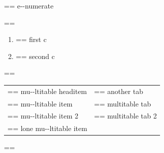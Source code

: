 \documentclass{book}
\makeatletter
\newenvironment{Texinfopreformatted}{%
  \par\GNUTobeylines\obeyspaces\frenchspacing\parskip=\z@\parindent=\z@}{}
{\catcode`\^^M=13 \gdef\GNUTobeylines{\catcode`\^^M=13 \def^^M{\null\par}}}
\newenvironment{Texinfoindented}{\begin{list}{}{}\item\relax}{\end{list}}
\renewcommand{\_}{\Texinfounderscore\discretionary{}{}{}}
\makeatother
\begin{document}
{{\begin{Texinfoindented}
\begin{enumerate}[label=\alph*.]
\begin{Texinfopreformatted}
\ttfamily e{-}{-}numerate
\end{Texinfopreformatted}
\end{enumerate}
\begin{Texinfopreformatted}%
\ttfamily 
\end{Texinfopreformatted}
\begin{enumerate}[label=\alph*.,start=3]
\item \begin{Texinfopreformatted}%
\ttfamily first c
\end{Texinfopreformatted}
\item \begin{Texinfopreformatted}%
\ttfamily second c
\end{Texinfopreformatted}
\end{enumerate}
\begin{Texinfopreformatted}%
\ttfamily 
\end{Texinfopreformatted}
\begin{tabular}{m{} m{}}%
\begin{Texinfopreformatted}%
\ttfamily mu{-}{-}ltitable headitem \end{Texinfopreformatted}&
\begin{Texinfopreformatted}%
\ttfamily another tab
\end{Texinfopreformatted}\\
\begin{Texinfopreformatted}%
\ttfamily mu{-}{-}ltitable item \end{Texinfopreformatted}&
\begin{Texinfopreformatted}%
\ttfamily multitable tab
\end{Texinfopreformatted}\\
\begin{Texinfopreformatted}%
\ttfamily mu{-}{-}ltitable item 2 \end{Texinfopreformatted}&
\begin{Texinfopreformatted}%
\ttfamily multitable tab 2
\index[cp]{index entry within multitable@index entry within multitable}%
\end{Texinfopreformatted}\\
\begin{Texinfopreformatted}%
\ttfamily lone mu{-}{-}ltitable item
\end{Texinfopreformatted}&\\
\end{tabular}%
\begin{Texinfopreformatted}%
\ttfamily 

\end{Texinfopreformatted}
\end{Texinfoindented}}}
\end{document}
